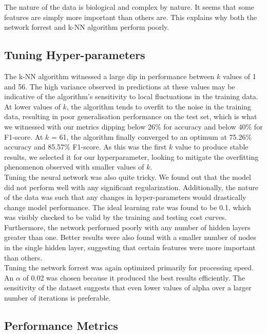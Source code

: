 \documentclass{article}
\begin{document}
The nature of the data is biological and complex by nature. It seems that some features are simply more important than others are. 
This explains why both the network forrest and k-NN algorithm perform poorly.

\subsection*{Tuning Hyper-parameters}

The k-NN algorithm witnessed a large dip in performance between $k$ values of 1 and 56.
The high variance observed in predictions at these values may be indicative of 
the algorithm's sensitivity to local fluctuations in the training data. 
At lower values of $k$, the algorithm tends to overfit to the noise in the training data, 
resulting in poor generalisation performance on the test set,
which is what we witnessed with our metrics dipping below 26\% for accuracy and below 40\% for F1-score.
At $k$ = 61, the algorithm finally converged to an optimum at 75.26\% accuracy and 85.57\% F1-score.
As this was the first $k$ value to produce stable results, we selected it for our hyperparameter, 
looking to mitigate the overfitting phenomenon observed with smaller values of $k$.
\\

Tuning the neural network was also quite tricky. We found out that the model did not perform well with any significant regularization.
Additionally, the nature of the data was such that any changes in hyper-parameters would drastically change model performance.
The ideal learning rate was found to be 0.1, which was visibly checked to be valid by the training and testing cost curves.
Furthermore, the network performed poorly with any number of hidden layers greater than one. Better results were also found with a smaller number of nodes in
the single hidden layer, suggesting that certain features were more important than others.
\\

Tuning the network forrest was again optimized primarily for processing speed. An $\alpha$ of 0.02 was chosen because it produced the best results efficiently.
The sensitivity of the dataset suggests that even lower values of alpha over a larger number of iterations is preferable.

\subsection*{Performance Metrics}
\end{document}
